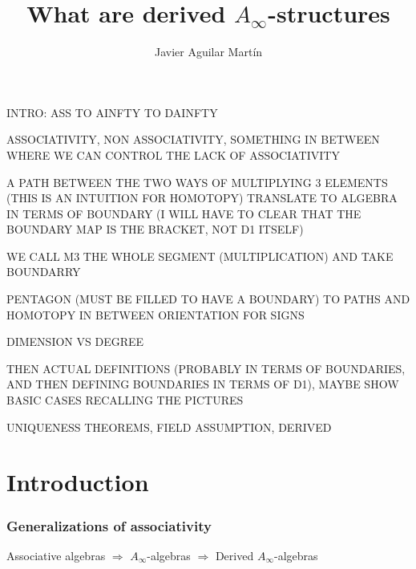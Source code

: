\documentclass{beamer}
\title{What are derived $A_\infty$-structures}
\author{Javier Aguilar Mart\'in}
\institute{University of Kent}
\date{}
\theoremstyle{definition}
\begin{document}
\frame{\titlepage}
%
% 
% 
% 

% 



\newcommand{\seti}{\setcounter{saveenumi}{\value{enumi}}}
\newcommand{\conti}{\setcounter{enumi}{\value{saveenumi}}}

\makeatletter
\makeatother


\begin{frame}
INTRO: ASS TO AINFTY TO DAINFTY

ASSOCIATIVITY, NON ASSOCIATIVITY, SOMETHING IN BETWEEN WHERE WE CAN CONTROL THE LACK OF ASSOCIATIVITY

A PATH BETWEEN THE TWO WAYS OF MULTIPLYING 3 ELEMENTS (THIS IS AN  INTUITION FOR HOMOTOPY) TRANSLATE TO ALGEBRA IN TERMS OF BOUNDARY (I WILL HAVE TO CLEAR THAT THE BOUNDARY MAP IS THE BRACKET, NOT D1 ITSELF)

WE CALL M3 THE WHOLE SEGMENT (MULTIPLICATION) AND TAKE BOUNDARRY

PENTAGON (MUST BE FILLED TO HAVE A BOUNDARY) TO PATHS AND HOMOTOPY IN BETWEEN ORIENTATION FOR SIGNS

DIMENSION VS DEGREE

THEN ACTUAL DEFINITIONS (PROBABLY IN TERMS OF BOUNDARIES, AND THEN DEFINING BOUNDARIES IN TERMS OF D1), MAYBE SHOW BASIC CASES RECALLING THE PICTURES

UNIQUENESS THEOREMS, FIELD ASSUMPTION, DERIVED
\end{frame}
\section{Introduction}
\begin{frame}
\frametitle{Generalizations of associativity}

Associative algebras $\Rightarrow$ $A_\infty$-algebras $\Rightarrow$ Derived $A_\infty$-algebras

\end{frame}
\end{document}
